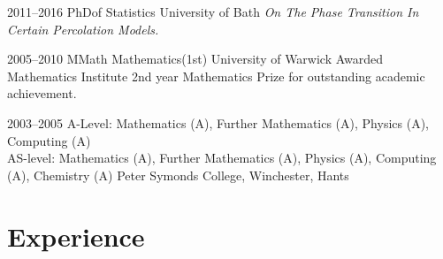 \documentclass[print, oneside]{friggeri-cv} %
\begin{document}
\begin{entrylist}
\entry
{2011--2016}
{PhD}{of Statistics}
{University of Bath}
{\emph{On The Phase Transition In Certain Percolation Models.}}


\entry
{2005--2010}
{MMath Mathematics}{(1st)}
{University of Warwick}
{Awarded Mathematics Institute 2nd year Mathematics Prize for outstanding academic achievement.}


\entrybasic
{2003--2005}
{A-Level{\normalfont : Mathematics (A), Further Mathematics (A), Physics (A), Computing (A) }\\ 
AS-level{\normalfont : Mathematics (A), Further Mathematics (A), Physics (A), Computing (A), Chemistry (A)}}
{Peter Symonds College, Winchester, Hants}
{}

%
%

\end{entrylist}

\pagebreak

\section{Experience}

\end{document}
